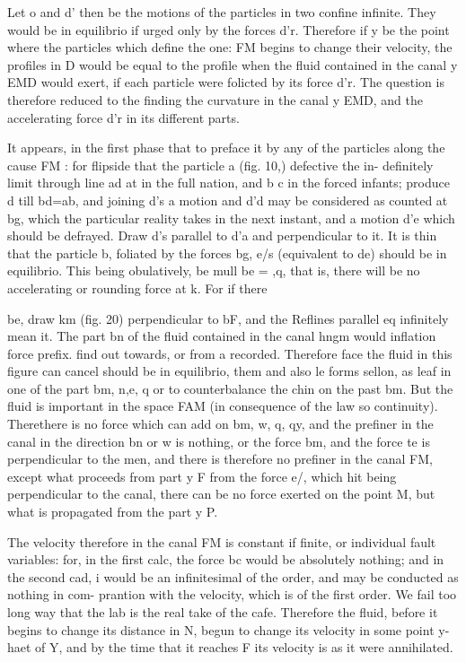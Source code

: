 \documentclass{article}
\begin{document}
Let o and d’ then be the motions of the particles in two confine infinite. They would be in equilibrio if urged only by the forces d’r. Therefore if y be the point where the particles which define the one: FM begins to change their velocity, the profiles in D would be equal to the profile when the fluid contained in the canal y EMD would exert, if each particle were folicted by its force d’r. The question is therefore reduced to the finding the curvature in the canal y EMD, and the accelerating force d’r in its different parts.

It appears, in the first phase that to preface it by any of the particles along the cause FM : for flipside that the particle a (fig. 10,) defective the in- definitely limit through line ad at in the full nation, and b c in the forced infants; produce d till bd=ab, and joining d’s a motion and d’d may be considered as counted at bg, which the particular reality takes in the next instant, and a motion d’e which should be defrayed. Draw d’s parallel to d’a and perpendicular to it. It is thin that the particle b, foliated by the forces bg, e/s (equivalent to de) should be in equilibrio. This being obulatively, be mull be = ,q, that is, there will be no accelerating or rounding force at k. For if there

be, draw km (fig. 20) perpendicular to bF, and the Reflines parallel eq infinitely mean it. The part bn of the fluid contained in the canal hngm would inflation force prefix. find out towards, or from a recorded. Therefore face the fluid in this figure can cancel should be in equilibrio, them and also le forms sellon, as leaf in one of the part bm, n,e, q or to counterbalance the chin on the past bm. But the fluid is important in the space FAM (in consequence of the law so continuity). Therethere is no force which can add on bm, w, q, qy, and the prefiner in the canal in the direction bn or w is nothing, or the force bm, and the force te is perpendicular to the men, and there is therefore no prefiner in the canal FM, except what proceeds from part y F from the force e/, which hit being perpendicular to the canal, there can be no force exerted on the point M, but what is propagated from the part y P.

The velocity therefore in the canal FM is constant if finite, or individual fault variables: for, in the first calc, the force bc would be absolutely nothing; and in the second cad, i would be an infinitesimal of the order, and may be conducted as nothing in com- prantion with the velocity, which is of the first order. We fail too long way that the lab is the real take of the cafe. Therefore the fluid, before it begins to change its distance in N, begun to change its velocity in some point y-haet of Y, and by the time that it reaches F its velocity is as it were annihilated.
\end{document}
